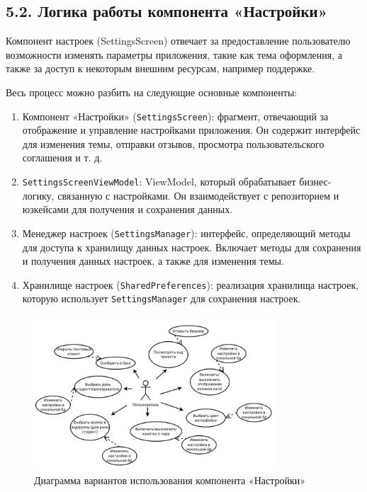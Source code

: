 \documentclass{vsureport}
\begin{document}
\subsection*{5.2. Логика работы компонента «Настройки»}


Компонент настроек (SettingsScreen) отвечает за предоставление пользователю возможности изменять параметры приложения, такие как тема оформления, а также за доступ к некоторым внешним ресурсам, например поддержке.

Весь процесс можно разбить на следующие основные компоненты:
\begin{enumerate}
    \item Компонент «Настройки» (\texttt{SettingsScreen}): фрагмент, отвечающий за отображение и управление настройками приложения. Он содержит интерфейс для изменения темы, отправки отзывов, просмотра пользовательского соглашения и т. д.
    \item \texttt{SettingsScreenViewModel}: ViewModel, который обрабатывает бизнес-логику, связанную с настройками. Он взаимодействует с репозиторием и юзкейсами для получения и сохранения данных.
    \item Менеджер настроек (\texttt{SettingsManager}): интерфейс, определяющий методы для доступа к хранилищу данных настроек. Включает методы для сохранения и получения данных настроек, а также для изменения темы.
    \item Хранилище настроек (\texttt{SharedPreferences}): реализация хранилища настроек, которую использует \texttt{SettingsManager} для сохранения настроек.
\end{enumerate}

\begin{figure}[H]
    \centering
    \includegraphics[width=0.8\textwidth]{12.png}
    \caption{Диаграмма вариантов использования компонента «Настройки»}
    \label{fig:fig12}
\end{figure}
\end{document}
